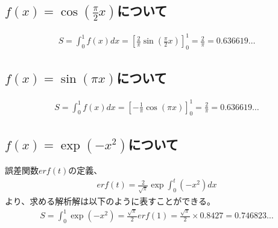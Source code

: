 \documentclass[12pt,a4paper]{jsarticle}
\begin{document}
\subsection{$f\left(x\right)=\cos\left(\frac{\pi}{2}x\right)$について}
\begin{eqnarray}
    S=\int_0^1f\left(x\right)dx=\left[\frac{2}{\pi}\sin\left(\frac{\pi}{2}x\right)\right]_0^1=\frac{2}{\pi}=0.636619\dots
\end{eqnarray}
\subsection{$f\left(x\right)=\sin\left(\pi x\right)$について}
\begin{eqnarray}
    S=\int_0^1f\left(x\right)dx=\left[-\frac{1}{\pi}\cos\left(\pi x\right)\right]_0^1=\frac{2}{\pi}=0.636619\dots
\end{eqnarray}
\subsection{$f\left(x\right)=\exp\left(-x^2\right)$について}
誤差関数$erf(t)$の定義、\\
\begin{eqnarray}
    erf\left(t\right)=\frac{2}{\sqrt{\pi}}\exp\int_0^t\left(-x^2\right)dx
\end{eqnarray}
より、求める解析解は以下のように表すことができる。
\begin{eqnarray}
    S=\int_0^1\exp\left(-x^2\right)=\frac{\sqrt{\pi}}{2}erf\left(1\right)=\frac{\sqrt{\pi}}{2}×0.8427=0.746823\dots
\end{eqnarray}
\end{document}
